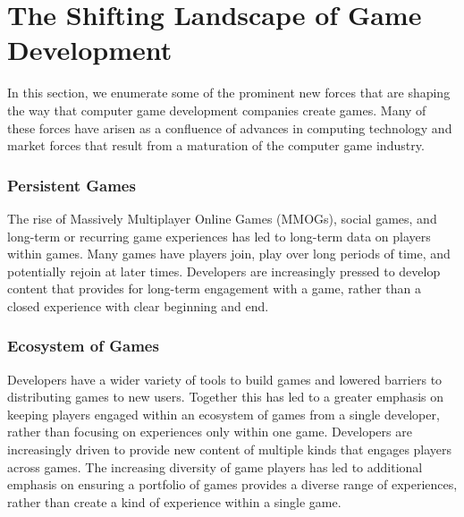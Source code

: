 \documentclass[conference]{IEEEtran}
\begin{document}

\section{The Shifting Landscape of Game Development}

In this section, we enumerate some of the prominent new forces that are shaping the way that computer game development companies create games. Many of these forces have arisen as a confluence of advances in computing technology and market forces that result from a maturation of the computer game industry.

\subsubsection{Persistent Games} 
The rise of Massively Multiplayer Online Games (MMOGs), social games, and long-term or recurring game experiences has led to long-term data on players within games. 
Many games have players join, play over long periods of time, and potentially rejoin at later times. 
Developers are increasingly pressed to develop content that provides for long-term engagement with a game, rather than a closed experience with clear beginning and end.

\subsubsection{Ecosystem of Games}
Developers have a wider variety of tools to build games and lowered barriers to distributing games to new users. Together this has led to a greater emphasis on keeping players engaged within an ecosystem of games from a single developer, rather than focusing on experiences only within one game. Developers are increasingly driven to provide new content of multiple kinds that engages players across games. The increasing diversity of game players has led to additional emphasis on ensuring a portfolio of games provides a diverse range of experiences, rather than create a kind of experience within a single game.

\end{document}
